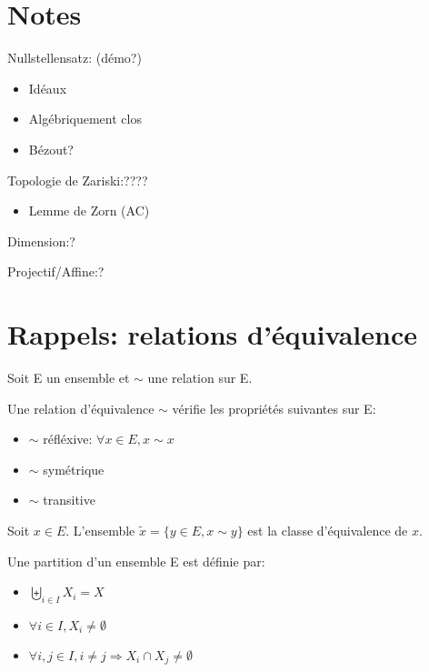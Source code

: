 \section{Notes}

Nullstellensatz: (démo?)
\begin{itemize}
    \item Idéaux
    \item Algébriquement clos
    \item Bézout?
\end{itemize}
\mbox{}

Topologie de Zariski:????
\begin{itemize}
    \item Lemme de Zorn (AC)
\end{itemize}
\mbox{}

Dimension:?
\mbox{}

Projectif/Affine:?
\mbox{}




\section{Rappels: relations d'équivalence}

Soit E un ensemble et $\sim$ une relation sur E.

\begin{definition}
    Une relation d'équivalence $\sim$ vérifie les propriétés suivantes sur E:
    \begin{itemize}
        \item $\sim$ réfléxive: $\forall x \in E, x \sim x$
        \item $\sim$ symétrique
        \item $\sim$ transitive
    \end{itemize}
\end{definition}

\begin{definition}
    Soit $x \in E$.
    L'ensemble $\tilde{x} = \{y \in E, x \sim y\}$ est la classe d'équivalence de $x$.
\end{definition}

\begin{definition}[partition]
    Une partition d'un ensemble E est définie par:
    \begin{itemize}
        \item $\biguplus_{i \in I} X_{i} = X$
        \item $\forall i \in I, X_{i} \neq \emptyset$
        \item $\forall i,j \in I, i \neq j \Rightarrow X_{i} \cap X_{j} \neq \emptyset$
    \end{itemize}
\end{definition}

